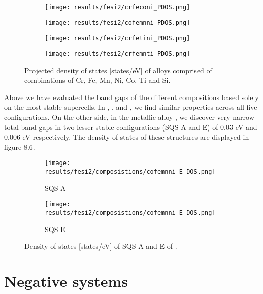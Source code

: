 \begin{figure}[H]
\begin{subfigure}{.5\textwidth}
\texttt{[image: results/fesi2/crfeconi\_PDOS.png]}
\caption{}
\end{subfigure}
\begin{subfigure}{.5\textwidth}
\texttt{[image: results/fesi2/cofemnni\_PDOS.png]}
\caption{}
\end{subfigure}
\begin{subfigure}{.5\textwidth}
\texttt{[image: results/fesi2/crfetini\_PDOS.png]}
\caption{}
\end{subfigure}
\begin{subfigure}{.5\textwidth}
\texttt{[image: results/fesi2/crfemnti\_PDOS.png]}
\caption{}
\end{subfigure}
\caption{Projected density of states [states/eV] of alloys comprised of combinations of Cr, Fe, Mn, Ni, Co, Ti and Si.}
\end{figure}

Above we have evaluated the band gaps of the different compositions based solely on the most stable supercells. In , ,  and , we find similar properties across all five configurations.  On the other side, in the metallic alloy , we discover very narrow total band gaps in two lesser stable configurations (SQS A and E) of 0.03 eV and 0.006 eV respectively. The density of states of these structures are displayed in figure 8.6.

\begin{figure}[H]
\begin{subfigure}{.5\textwidth}
\texttt{[image: results/fesi2/composistions/cofemnni\_E\_DOS.png]}
\caption{SQS A}
\end{subfigure}
\begin{subfigure}{.5\textwidth}
\texttt{[image: results/fesi2/composistions/cofemnni\_E\_DOS.png]}
\caption{SQS E}
\end{subfigure}
\caption{Density of states [states/eV] of SQS A and E of .}
\end{figure} 

\newpage
\section{Negative systems}

